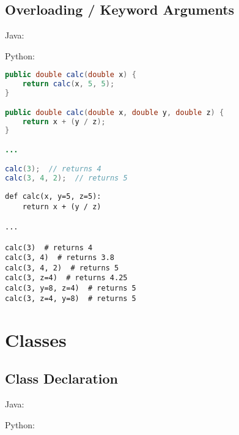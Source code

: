 \documentclass{article}
\begin{document}
\subsection{Overloading / Keyword Arguments}
\begin{minipage}{0.45\linewidth}
    Java:
\end{minipage}
\hfill
\begin{minipage}{0.45\linewidth}
    Python:
\end{minipage}

\begin{minipage}{0.45\linewidth}
    \begin{lstlisting}[language=Java]
public double calc(double x) {
    return calc(x, 5, 5);
}

public double calc(double x, double y, double z) {
    return x + (y / z);
}

...

calc(3);  // returns 4
calc(3, 4, 2);  // returns 5
    \end{lstlisting}
\end{minipage}
\hfill
\begin{minipage}{0.45\linewidth}
    \begin{lstlisting}
def calc(x, y=5, z=5):
    return x + (y / z)

...

calc(3)  # returns 4
calc(3, 4)  # returns 3.8
calc(3, 4, 2)  # returns 5
calc(3, z=4)  # returns 4.25
calc(3, y=8, z=4)  # returns 5
calc(3, z=4, y=8)  # returns 5
    \end{lstlisting}
\end{minipage}

\section{Classes}
\subsection{Class Declaration}
\begin{minipage}{0.45\linewidth}
    Java:
\end{minipage}
\hfill
\begin{minipage}{0.45\linewidth}
    Python:
\end{minipage}
\end{document}

